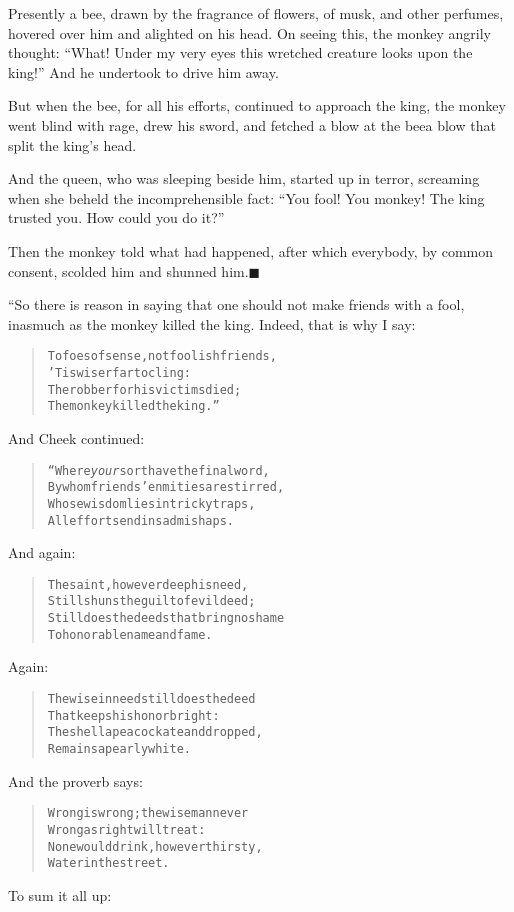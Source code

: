 \documentclass[article, twoside, 14pt]{memoir}
\newcommand{\qed}{\hfill \ensuremath{\blacksquare}}
\renewenvironment{verbatim}{%
\begin{quote}%
\vskip -10pt%
\begin{alltt}\normalfont\large}{\end{alltt}%
\end{quote}%
\vskip -10pt
} %
\begin{document}
Presently a bee, drawn by the fragrance of flowers, of musk, and
other perfumes, hovered over him and alighted on his head. On
seeing this, the monkey angrily thought:
``What! Under my very eyes this wretched creature looks upon the king!''
And he undertook to drive him away.

But when the bee, for all his efforts, continued to approach the
king, the monkey went blind with rage, drew his sword, and fetched
a blow at the bee{\textemdash}a blow that split the king's head.

And the queen, who was sleeping beside him, started up in terror,
screaming when she beheld the incomprehensible fact:
``You fool! You monkey! The king trusted you. How could you do it?''

Then the monkey told what had happened, after which everybody, by
common consent, scolded him and shunned him.\hyperref[s34]{\qed}

“So there is reason in saying that one should not make friends with
a fool, inasmuch as the monkey killed the king. Indeed, that is why
I say:

\begin{verbatim}
To foes of sense, not foolish friends,
    'Tis wiser far to cling:
The robber for his victims died;
    The monkey killed the king.”
\end{verbatim}
And Cheek continued:

\begin{verbatim}
“Where \emph{your} sort have the final word,
By whom friends' enmities are stirred,
Whose wisdom lies in tricky traps,
All efforts end in sad mishaps.
\end{verbatim}
And again:

\begin{verbatim}
The saint, however deep his need,
Still shuns the guilt of evil deed;
Still does the deeds that bring no shame
To honorable name and fame.
\end{verbatim}
Again:

\begin{verbatim}
The wise in need still does the deed
    That keeps his honor bright:
The shell a peacock ate and dropped,
    Remains a pearly white.
\end{verbatim}
And the proverb says:

\begin{verbatim}
Wrong is wrong; the wise man never
    Wrong as right will treat:
None would drink, however thirsty,
    Water in the street.
\end{verbatim}
To sum it all up:
\end{document}
